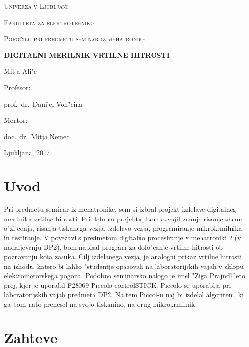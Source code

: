 \documentclass[a4paper]{article}
\begin{document}
\begin{titlepage}
	\centering

	{\scshape\LARGE Univerza v Ljubljani \par}
	{\scshape\large Fakulteta za elektrotehniko \par}
	\vspace{3cm}
	{\scshape\Large Poro\v cilo pri predmetu seminar iz mehatronike\par}
	\vspace{1.5cm}
	{\huge\bfseries DIGITALNI MERILNIK VRTILNE HITROSTI\par}
	\vspace{2cm}
	{\Large Mitja Ali"c\par}
	\vspace{0.5cm}
	Profesor:\par
	prof.~dr.~Danijel Von"cina\par
		\vspace{0.25cm}
	Mentor:\par
	doc.~dr.~Mitja Nemec\par
	

	\vfill

	{\large Ljubljana, 2017\par}
\end{titlepage}


\tableofcontents

\newpage

\section{Uvod}
Pri predmetu seminar iz mehatronike, sem si izbral projekt izdelave digitalneg merilnika vrtilne hitrosti. Pri delu na projektu, bom osvojil znanje risanje sheme o"zi"cenja, risanja tiskanega vezja, izdelavo vezja, programiranje mikrokrmilnika in testiranje. V povezavi s predmetom digitalno procesiranje v mehatroniki 2 (v nadaljevanju DP2), bom napisal program za dolo"canje vrtilne hitrosti ob poznavanju kota zasuka. Cilj izdelanega vezja, je analogni prikaz vrtilne hitrosti na izhodu, katero bi lahko "studentje opazovali na laboratorijskih vajah v sklopu elektromotorskega pogona. Podobno seminarsko nalogo je imel "Ziga Prajndl \cite{prajndl} leto prej, kjer je uporabil F28069 Piccolo controlSTICK. Piccolo se uporablja pri laboratorijskih vajah predmeta DP2. Na tem Piccol-u naj bi izdelal algoritem, ki ga bom nato prenesel na svojo tiskanino, na drug mikrokrmilnik.

\section{Zahteve}
\end{document}
